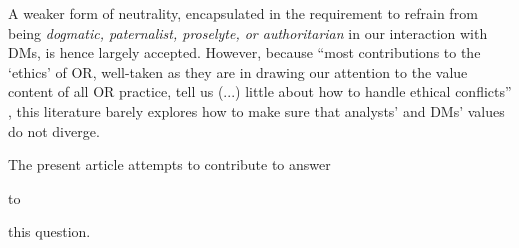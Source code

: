 \documentclass[preprint, french, english, 11pt, authoryear]{elsarticle}%
\newcommand{\ac}[1]{#1}
\newcommand{\acp}[1]{#1s}
\begin{document}
\begin{changebar}
A weaker form of neutrality, encapsulated in the requirement to refrain from being \emph{dogmatic, paternalist, proselyte, or authoritarian} in our interaction with \acp{DM}, is hence largely accepted.
However, because ``most contributions to the ‘ethics’ of \ac{OR}, well-taken as they are in drawing our attention to the value content of all \ac{OR} practice, tell us (...) little about how to handle ethical conflicts'' \citep{ormerod_operational_2013},
this literature barely explores how to make sure that analysts' and \acp{DM}' values do not diverge.\end{changebar}
The present article attempts to contribute to answer \begin{changebar}to\end{changebar} this question.
\end{document}
